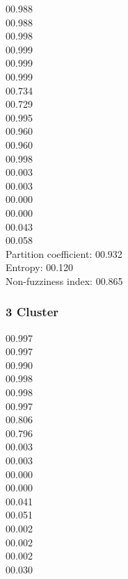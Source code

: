 00.988  \\
00.988	\\
00.998	\\
00.999	\\
00.999	\\
00.999	\\
00.734	\\
00.729	\\
00.995	\\
00.960	\\
00.960	\\
00.998	\\
00.003	\\
00.003	\\
00.000	\\
00.000	\\
00.043	\\
00.058	\\

Partition coefficient:	00.932\\
Entropy:		00.120\\
Non-fuzziness index:	00.865

\subsubsection*{3 Cluster}

00.997	\\
00.997	\\
00.990	\\
00.998	\\
00.998	\\
00.997	\\
00.806	\\
00.796	\\
00.003	\\
00.003	\\
00.000	\\
00.000	\\
00.041	\\
00.051	\\
00.002	\\
00.002	\\
00.002	\\
00.030	\\



